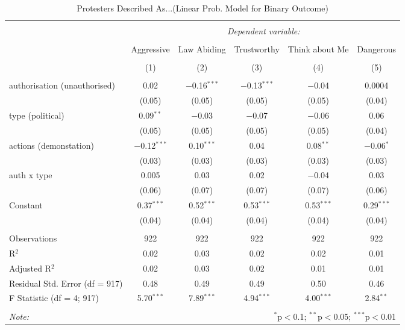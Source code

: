 
\begin{table}[!htbp] \centering 
  \caption{Protesters Described As...(Linear Prob. Model for Binary Outcome)} 
  \label{} 
\begin{tabular}{@{\extracolsep{5pt}}lccccc} 
\\[-1.8ex]\hline 
\hline \\[-1.8ex] 
 & \multicolumn{5}{c}{\textit{Dependent variable:}} \\ 
\cline{2-6} 
\\[-1.8ex] & Aggressive & Law Abiding & Trustworthy & Think about Me & Dangerous \\ 
\\[-1.8ex] & (1) & (2) & (3) & (4) & (5)\\ 
\hline \\[-1.8ex] 
 authorisation (unauthorised) & 0.02 & $-$0.16$^{***}$ & $-$0.13$^{***}$ & $-$0.04 & 0.0004 \\ 
  & (0.05) & (0.05) & (0.05) & (0.05) & (0.04) \\ 
  type (political) & 0.09$^{**}$ & $-$0.03 & $-$0.07 & $-$0.06 & 0.06 \\ 
  & (0.05) & (0.05) & (0.05) & (0.05) & (0.04) \\ 
  actions (demonstation) & $-$0.12$^{***}$ & 0.10$^{***}$ & 0.04 & 0.08$^{**}$ & $-$0.06$^{*}$ \\ 
  & (0.03) & (0.03) & (0.03) & (0.03) & (0.03) \\ 
  auth x type & 0.005 & 0.03 & 0.02 & $-$0.04 & 0.03 \\ 
  & (0.06) & (0.07) & (0.07) & (0.07) & (0.06) \\ 
  Constant & 0.37$^{***}$ & 0.52$^{***}$ & 0.53$^{***}$ & 0.53$^{***}$ & 0.29$^{***}$ \\ 
  & (0.04) & (0.04) & (0.04) & (0.04) & (0.04) \\ 
 \hline \\[-1.8ex] 
Observations & 922 & 922 & 922 & 922 & 922 \\ 
R$^{2}$ & 0.02 & 0.03 & 0.02 & 0.02 & 0.01 \\ 
Adjusted R$^{2}$ & 0.02 & 0.03 & 0.02 & 0.01 & 0.01 \\ 
Residual Std. Error (df = 917) & 0.48 & 0.49 & 0.49 & 0.50 & 0.46 \\ 
F Statistic (df = 4; 917) & 5.70$^{***}$ & 7.89$^{***}$ & 4.94$^{***}$ & 4.00$^{***}$ & 2.84$^{**}$ \\ 
\hline 
\hline \\[-1.8ex] 
\textit{Note:}  & \multicolumn{5}{r}{$^{*}$p$<$0.1; $^{**}$p$<$0.05; $^{***}$p$<$0.01} \\ 
\end{tabular} 
\end{table} 
